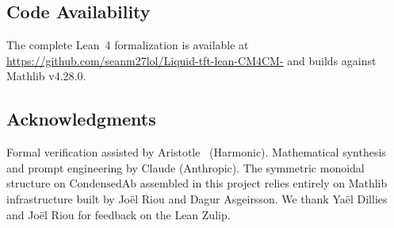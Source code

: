 \documentclass[11pt]{amsart}
\theoremstyle{plain}
\theoremstyle{definition}
\newcommand{\CondAb}{\mathrm{CondensedAb}}
\begin{document}
\subsection*{Code Availability}

The complete Lean~4 formalization is available at \url{https://github.com/seanm27lol/Liquid-tft-lean-CM4CM-} and builds against Mathlib v4.28.0.

\subsection*{Acknowledgments}

Formal verification assisted by Aristotle~\cite{Aristotle2025} (Harmonic). Mathematical synthesis and prompt engineering by Claude (Anthropic). The symmetric monoidal structure on $\CondAb$ assembled in this project relies entirely on Mathlib infrastructure built by Jo\"el Riou and Dagur Asgeirsson. We thank Ya\"el Dillies and Jo\"el Riou for feedback on the Lean Zulip.



\end{document}
